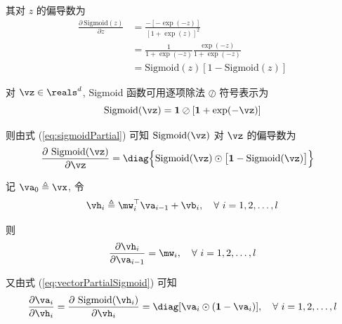 \documentclass[openany]{ctexbook}
\theoremstyle{kaiti}
\theoremstyle{normal}
\begin{document}
其对 $z$ 的偏导数为
\begin{equation}
  \begin{aligned}
    \frac{\partial~\mathrm{Sigmoid}(z)}{\partial z}
    &=\frac{-[-\exp(-z)]}{[1+\exp(z)]^2}\\
    &=\frac{1}{1+\exp(-z)}\frac{\exp(-z)}{1+\exp(-z)}\\
    &=\mathrm{Sigmoid}(z)[1-\mathrm{Sigmoid}(z)]
  \end{aligned}
  \label{eq:sigmoidPartial}
\end{equation}

对 $\vz\in\reals^d$, Sigmoid 函数可用逐项除法 $\oslash$ 符号表示为
\begin{equation}
  \mathrm{Sigmoid}(\vz)=\bm{1}\oslash[\bm{1}+\exp(-\vz)]
\end{equation}

则由式 (\ref{eq:sigmoidPartial}) 可知 $\mathrm{Sigmoid}(\vz)$ 对 $\vz$ 的偏导数为
\begin{equation}
  \begin{aligned}
    \frac{\partial~\mathrm{Sigmoid}(\vz)}{\partial\vz}
    &=\diag\Big\{\mathrm{Sigmoid}(\vz)\odot\big[\bm{1}-\mathrm{Sigmoid}(\vz)\big]\Big\}
  \end{aligned}
  \label{eq:vectorPartialSigmoid}
\end{equation}

记 $\va_0\triangleq\vx$, 令
\begin{equation}
  \vh_i\triangleq\mw_i^\top\va_{i-1}+\vb_i,\quad\forall~i=1,2,\dots,l
\end{equation}

则
\begin{equation}
  \frac{\partial\vh_i}{\partial\va_{i-1}}=\mw_i,\quad\forall~i=1,2,\dots,l
\end{equation}

又由式 (\ref{eq:vectorPartialSigmoid}) 可知
\begin{equation}
  \frac{\partial\va_i}{\partial\vh_i}=\frac{\partial~\mathrm{Sigmoid}(\vh_i)}{\partial\vh_i}=\diag[\va_i\odot(\bm{1}-\va_i)],\quad\forall~i=1,2,\dots,l
\end{equation}
\end{document}
